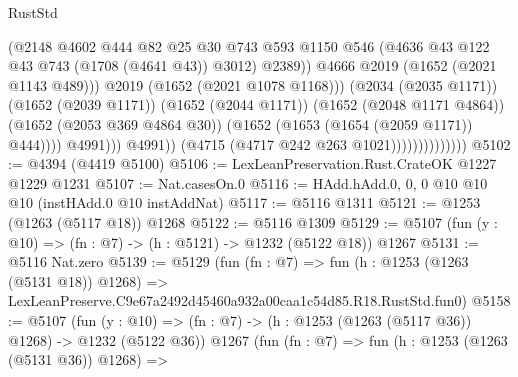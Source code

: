 \begin{lexlean}{RustStd}
\begin{coremodule}
                                                (@2148
                                                  @4602
                                                  @444
                                                  @82
                                                  @25
                                                  @30
                                                  @743
                                                  @593
                                                  @1150
                                                  @546
                                                  (@4636
                                                    @43
                                                    @122
                                                    @43
                                                    @743
                                                    (@1708 (@4641 @43))
                                                    @3012)
                                                  @2389))
                                              @4666
                                              @2019
                                              (@1652 (@2021 @1143 @489)))
                                            @2019
                                            (@1652 (@2021 @1078 @1168)))
                                          (@2034 (@2035 @1171))
                                          (@1652 (@2039 @1171))
                                          (@1652 (@2044 @1171))
                                          (@1652 (@2048 @1171 @4864))
                                          (@1652 (@2053 @369 @4864 @30))
                                          (@1652 (@1653 (@1654 (@2059 @1171)) @444))))
                                      @4991)))
                                @4991))
                            (@4715 (@4717 @242 @263 @1021))))))))))))))
@5102 := @4394 (@4419 @5100)
@5106 := LexLeanPreservation.Rust.CrateOK @1227 @1229 @1231
@5107 := Nat.casesOn.{0}
@5116 := HAdd.hAdd.{0, 0, 0} @10 @10 @10 (instHAdd.{0} @10 instAddNat)
@5117 := @5116 @1311
@5121 := @1253 (@1263 (@5117 @18)) @1268
@5122 := @5116 @1309
@5129 := @5107 (fun (y : @10) => (fn : @7) -> (h : @5121) -> @1232 (@5122 @18)) @1267
@5131 := @5116 Nat.zero
@5139 := @5129
    (fun (fn : @7) =>
    fun (h : @1253 (@1263 (@5131 @18)) @1268) =>
    LexLeanPreserve.C9e67a2492d45460a932a00caa1c54d85.R18.RustStd.fun0)
@5158 := @5107
    (fun (y : @10) => (fn : @7) -> (h : @1253 (@1263 (@5117 @36)) @1268) -> @1232 (@5122 @36))
    @1267
    (fun (fn : @7) =>
    fun (h : @1253 (@1263 (@5131 @36)) @1268) =>

\end{coremodule}
\end{lexlean}
